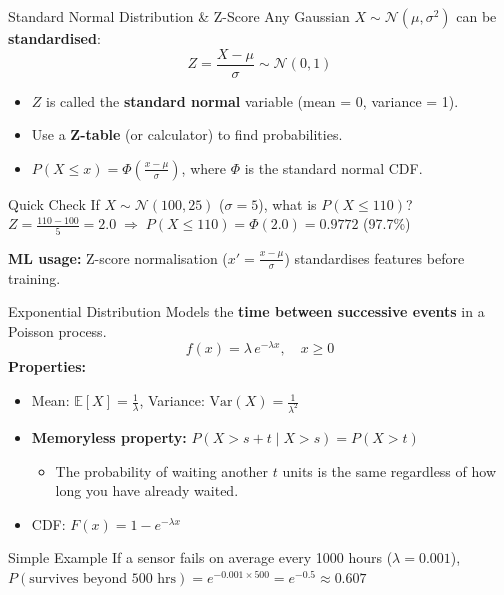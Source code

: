 \begin{frame}{Standard Normal Distribution \& Z-Score}
Any Gaussian $X \sim \mathcal{N}(\mu, \sigma^2)$ can be \textbf{standardised}:
\[
Z = \frac{X - \mu}{\sigma} \sim \mathcal{N}(0, 1)
\]
\begin{itemize}
    \item $Z$ is called the \textbf{standard normal} variable (mean = 0, variance = 1).
    \item Use a \textbf{Z-table} (or calculator) to find probabilities.
    \item $P(X \leq x) = \Phi\!\left(\frac{x - \mu}{\sigma}\right)$, where $\Phi$ is the standard normal CDF.
\end{itemize}
\begin{exampleblock}{Quick Check}
If $X \sim \mathcal{N}(100, 25)$ ($\sigma=5$), what is $P(X \leq 110)$?\\[4pt]
$Z = \frac{110 - 100}{5} = 2.0 \;\Rightarrow\; P(X \leq 110) = \Phi(2.0) = 0.9772$ \quad (97.7\%)
\end{exampleblock}
\textbf{ML usage:} Z-score normalisation ($x' = \frac{x-\mu}{\sigma}$) standardises features before training.
\end{frame}

\begin{frame}{Exponential Distribution}
Models the \textbf{time between successive events} in a Poisson process.
\[
f(x) = \lambda\, e^{-\lambda x}, \quad x \geq 0
\]
\textbf{Properties:}
\begin{itemize}
    \item Mean: $\mathbb{E}[X] = \frac{1}{\lambda}$, \quad Variance: $\mathrm{Var}(X) = \frac{1}{\lambda^2}$
    \item \textbf{Memoryless property:} $P(X > s + t \mid X > s) = P(X > t)$
    \begin{itemize}
        \item The probability of waiting another $t$ units is the same regardless of how long you have already waited.
    \end{itemize}
    \item CDF: $F(x) = 1 - e^{-\lambda x}$
\end{itemize}
\begin{exampleblock}{Simple Example}
If a sensor fails on average every 1000 hours ($\lambda = 0.001$),\\
$P(\text{survives beyond 500 hrs}) = e^{-0.001 \times 500} = e^{-0.5} \approx 0.607$
\end{exampleblock}
\end{frame}

